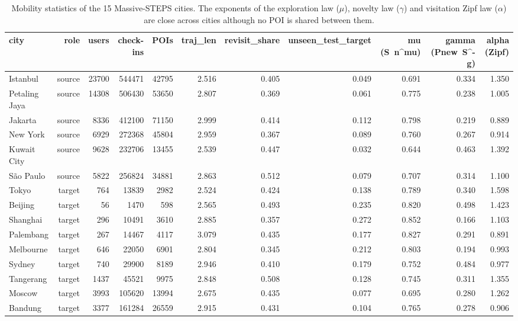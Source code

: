 \begin{table}[t]
\centering\small
\caption{Mobility statistics of the 15 Massive-STEPS cities. The exponents of the exploration law ($\mu$), novelty law ($\gamma$) and visitation Zipf law ($\alpha$) are close across cities although no POI is shared between them.}
\label{tab:A1_mobility_laws}
\begin{tabular}{lrrrrrrrrrr}
\toprule
city & role & users & check-ins & POIs & traj\_len & revisit\_share & unseen\_test\_target & mu (S~n^mu) & gamma (Pnew~S^-g) & alpha (Zipf) \\
\midrule
Istanbul & source & 23700 & 544471 & 42795 & 2.516 & 0.405 & 0.049 & 0.691 & 0.334 & 1.350 \\
Petaling Jaya & source & 14308 & 506430 & 53650 & 2.807 & 0.369 & 0.061 & 0.775 & 0.238 & 1.005 \\
Jakarta & source & 8336 & 412100 & 71150 & 2.999 & 0.414 & 0.112 & 0.798 & 0.219 & 0.889 \\
New York & source & 6929 & 272368 & 45804 & 2.959 & 0.367 & 0.089 & 0.760 & 0.267 & 0.914 \\
Kuwait City & source & 9628 & 232706 & 13455 & 2.539 & 0.447 & 0.032 & 0.644 & 0.463 & 1.392 \\
São Paulo & source & 5822 & 256824 & 34881 & 2.863 & 0.512 & 0.079 & 0.707 & 0.314 & 1.100 \\
Tokyo & target & 764 & 13839 & 2982 & 2.524 & 0.424 & 0.138 & 0.789 & 0.340 & 1.598 \\
Beijing & target & 56 & 1470 & 598 & 2.565 & 0.493 & 0.235 & 0.820 & 0.498 & 1.423 \\
Shanghai & target & 296 & 10491 & 3610 & 2.885 & 0.357 & 0.272 & 0.852 & 0.166 & 1.103 \\
Palembang & target & 267 & 14467 & 4117 & 3.079 & 0.435 & 0.177 & 0.827 & 0.291 & 0.891 \\
Melbourne & target & 646 & 22050 & 6901 & 2.804 & 0.345 & 0.212 & 0.803 & 0.194 & 0.993 \\
Sydney & target & 740 & 29900 & 8189 & 2.946 & 0.410 & 0.179 & 0.752 & 0.484 & 0.977 \\
Tangerang & target & 1437 & 45521 & 9975 & 2.848 & 0.508 & 0.128 & 0.745 & 0.311 & 1.355 \\
Moscow & target & 3993 & 105620 & 13994 & 2.675 & 0.435 & 0.077 & 0.695 & 0.280 & 1.262 \\
Bandung & target & 3377 & 161284 & 26559 & 2.915 & 0.431 & 0.104 & 0.765 & 0.278 & 0.906 \\
\bottomrule
\end{tabular}
\end{table}
